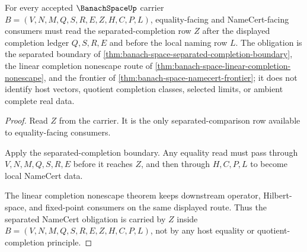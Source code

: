 \begin{theorem}
\label{thm:banach-space-separated-namecert-obligation}
For every accepted $\BanachSpaceUp$ carrier $B=(V,N,M,Q,S,R,E,Z,H,C,P,L)$, equality-facing and NameCert-facing consumers must read the separated-completion row $Z$ after the displayed completion ledger $Q,S,R,E$ and before the local naming row $L$. The obligation is the separated boundary of \autoref{thm:banach-space-separated-completion-boundary}, the linear completion nonescape route of \autoref{thm:banach-space-linear-completion-nonescape}, and the frontier of \autoref{thm:banach-space-namecert-frontier}; it does not identify host vectors, quotient completion classes, selected limits, or ambient complete real data.
\end{theorem}
\begin{proof}
Read $Z$ from the carrier. It is the only separated-comparison row available to equality-facing consumers.

Apply the separated-completion boundary. Any equality read must pass through $V,N,M,Q,S,R,E$ before it reaches $Z$, and then through $H,C,P,L$ to become local NameCert data.

The linear completion nonescape theorem keeps downstream operator, Hilbert-space, and fixed-point consumers on the same displayed route. Thus the separated NameCert obligation is carried by $Z$ inside $B=(V,N,M,Q,S,R,E,Z,H,C,P,L)$, not by any host equality or quotient-completion principle.
\end{proof}

